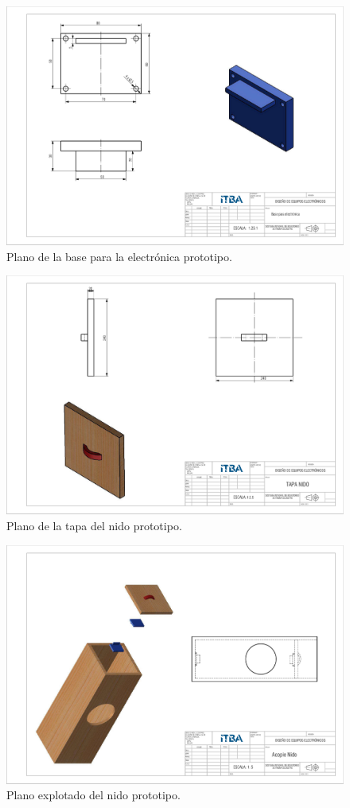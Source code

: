 \begin{figure}[H]
	\centering
	\includegraphics[width=\linewidth]{ImagenesApendice/Base_electronica_plano}
	\caption{Plano de la base para la electr\'onica prototipo.}
	\label{fig:Base_electronica_plano}
\end{figure}

\begin{figure}[H]
	\centering
	\includegraphics[width=\linewidth]{ImagenesApendice/tapa_nido_plano}
	\caption{Plano de la tapa del nido prototipo.}
	\label{fig:tapa_nido_plano}
\end{figure}

\begin{figure}[H]
	\centering
	\includegraphics[width=\linewidth]{ImagenesApendice/explotado_nido}
	\caption{Plano explotado del nido prototipo.}
	\label{fig:explotado_nido_plano}
\end{figure}

